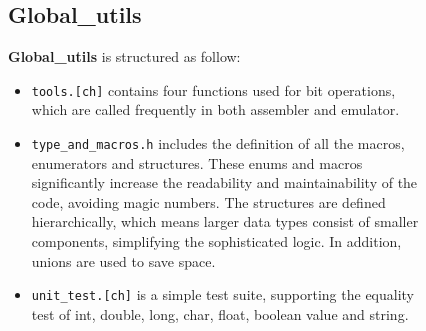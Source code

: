 \documentclass{article}
\begin{document}
\begin{figure}[ht]

\begin{minipage}{0.6\linewidth}
    \subsection{Global\_utils}
    \textbf{Global\_utils} is structured as follow:
    \begin{itemize}
        \item \texttt{tools.[ch]} contains four functions used for bit operations, which are called frequently in both assembler and emulator.
        \item \texttt{type\_and\_macros.h} includes the definition of all the macros, enumerators and structures. These enums and macros significantly increase the readability and maintainability of the code, avoiding magic numbers. The structures are defined hierarchically, which means larger data types consist of smaller components, simplifying the sophisticated logic. In addition,  unions are used to save space.
        \item \texttt{unit\_test.[ch]} is a simple test suite, supporting the equality test of int, double, long, char, float, boolean value and string.
    \end{itemize}
    

\end{minipage}
\end{figure}
\end{document}
